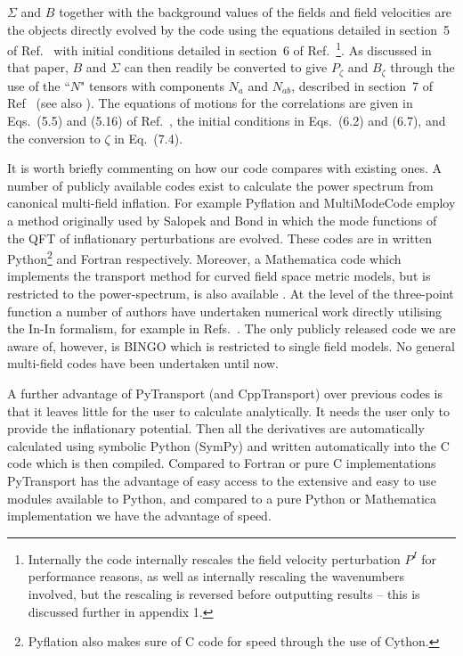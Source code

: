 \documentclass[10pt,
amsmath,amssymb,
aps,prd,nofootinbib,eqsecnum,a4paper]{revtex4}
\newcommand{\CC}{C\nolinebreak\hspace{-.05em}\raisebox{.4ex}{\tiny\bf +}\nolinebreak\hspace{-.10em}\raisebox{.4ex}{\tiny\bf +}}
\def\CC{{C\nolinebreak[4]\hspace{-.05em}\raisebox{.4ex}{\tiny\bf ++}}}
\def\S{ }
\begin{document}
$\Sigma$ and $B$ together with the background 
values of the fields and field velocities are the objects directly evolved by the code using the equations 
detailed in section~5 of Ref.~\cite{xxx} with 
initial conditions 
detailed in section~6 of Ref.~\cite{xxx}\footnote{Internally the code internally rescales 
the field velocity perturbation $P^I$ for 
performance reasons, as well as internally rescaling the wavenumbers involved, but the rescaling is reversed before 
outputting results -- this is discussed further in appendix 1.}. As 
discussed in that paper, $B$ and $\Sigma$ can then 
readily be converted to give $P_\zeta$ and $B_\zeta$ through the use of the ``$N$" tensors with components $N_a$ and $N_{ab}$, 
described in section~7 of Ref~\cite{xxx} (see also \cite{Dias:2014msa}). 
The equations of motions for the correlations 
are given in Eqs.~(5.5) and (5.16) of  Ref.~\cite{xxx}, the initial conditions in Eqs.~(6.2) and (6.7),
and the conversion to $\zeta$ in 
Eq.~(7.4). 


It is worth briefly commenting on how our code compares with existing ones. A number of publicly available 
codes exist to calculate the power spectrum from canonical multi-field inflation. 
For example Pyflation \cite{Huston:2011fr} and 
MultiModeCode \cite{Price:2014xpa} employ a method originally used by Salopek and Bond \cite{Salopek:1988qh}
in which the mode functions of the QFT of inflationary perturbations are evolved. These codes are 
in written Python\footnote{Pyflation also makes sure of C code for speed through the use of Cython.} and Fortran respectively.
Moreover, a Mathematica code which implements the transport method for curved field space 
metric models, but is restricted to the power-spectrum, is also available
\cite{Dias:2015rca}. At the level of the three-point function a number of authors 
have undertaken numerical work directly utilising 
the In-In formalism, for example in Refs.~\cite{Chen:2006xjb,Chen:2008wn, Hazra:2012yn,Funakoshi:2012ms,Horner:2013sea}. 
The only publicly released code we are aware of, however, is BINGO \cite{Hazra:2012yn} which is restricted to single field models. 
No general multi-field codes have been undertaken until now.

A further advantage of PyTransport (and CppTransport) over previous codes is that it leaves
little for the user to calculate analytically. 
It needs the user only 
to provide the inflationary potential. Then all the derivatives are automatically calculated using 
symbolic Python (SymPy) and written automatically into the \CC \S  code which is then compiled. 
Compared to Fortran or pure \CC \S  
implementations PyTransport 
has the advantage of easy access to the extensive and easy to use modules available to 
Python, and compared to a pure Python or Mathematica implementation we have the advantage of speed.
\end{document}
